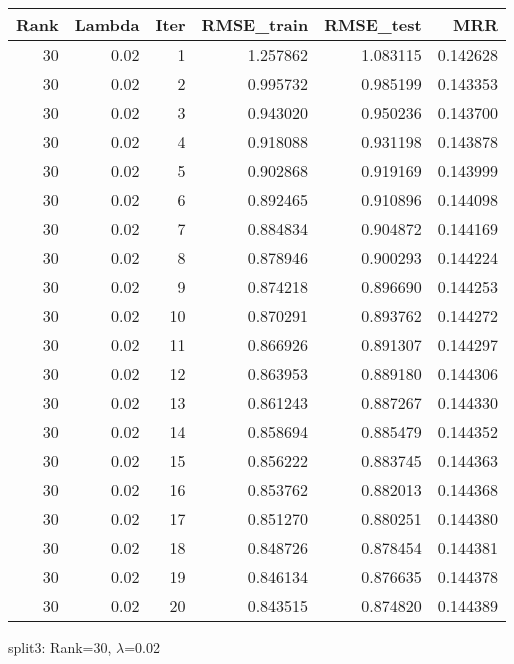 \begin{tabular}{rrrrrr}
\toprule
 Rank &  Lambda &  Iter &  RMSE\_train &  RMSE\_test &       MRR \\
\midrule
   30 &    0.02 &     1 &    1.257862 &   1.083115 &  0.142628 \\
   30 &    0.02 &     2 &    0.995732 &   0.985199 &  0.143353 \\
   30 &    0.02 &     3 &    0.943020 &   0.950236 &  0.143700 \\
   30 &    0.02 &     4 &    0.918088 &   0.931198 &  0.143878 \\
   30 &    0.02 &     5 &    0.902868 &   0.919169 &  0.143999 \\
   30 &    0.02 &     6 &    0.892465 &   0.910896 &  0.144098 \\
   30 &    0.02 &     7 &    0.884834 &   0.904872 &  0.144169 \\
   30 &    0.02 &     8 &    0.878946 &   0.900293 &  0.144224 \\
   30 &    0.02 &     9 &    0.874218 &   0.896690 &  0.144253 \\
   30 &    0.02 &    10 &    0.870291 &   0.893762 &  0.144272 \\
   30 &    0.02 &    11 &    0.866926 &   0.891307 &  0.144297 \\
   30 &    0.02 &    12 &    0.863953 &   0.889180 &  0.144306 \\
   30 &    0.02 &    13 &    0.861243 &   0.887267 &  0.144330 \\
   30 &    0.02 &    14 &    0.858694 &   0.885479 &  0.144352 \\
   30 &    0.02 &    15 &    0.856222 &   0.883745 &  0.144363 \\
   30 &    0.02 &    16 &    0.853762 &   0.882013 &  0.144368 \\
   30 &    0.02 &    17 &    0.851270 &   0.880251 &  0.144380 \\
   30 &    0.02 &    18 &    0.848726 &   0.878454 &  0.144381 \\
   30 &    0.02 &    19 &    0.846134 &   0.876635 &  0.144378 \\
   30 &    0.02 &    20 &    0.843515 &   0.874820 &  0.144389 \\
\bottomrule
\end{tabular}

\caption{split3: Rank=30, $\lambda$=0.02}
